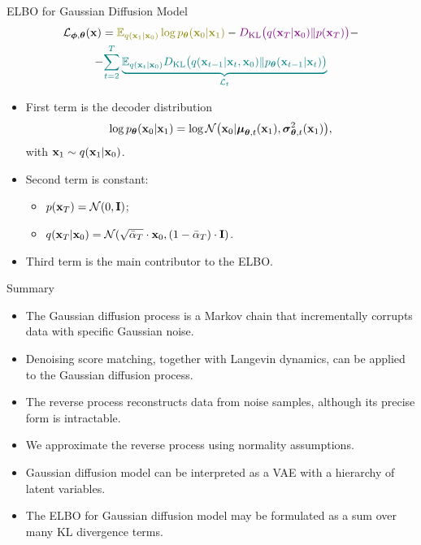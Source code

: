 \documentclass{beamer}
\begin{document}
\begin{frame}{ELBO for Gaussian Diffusion Model}
        \vspace{-0.5cm}
        \begin{multline*}
            \cL_{\bphi, \btheta}(\bx) =  {\color{olive}\bbE_{q(\bx_1 | \bx_0)} \log \pt(\bx_0 | \bx_1)} - {\color{violet}\KL\bigl(q(\bx_T | \bx_0) \| p(\bx_T)\bigr)} - \\
            - {\color{teal}\sum_{t=2}^T \underbrace{ \bbE_{q(\bx_t | \bx_0)} \KL \bigl(q(\bx_{t-1} | \bx_t, \bx_0) \| \pt(\bx_{t-1} | \bx_t)\bigr)}_{\cL_t}}
        \end{multline*}
        \vspace{-0.5cm}
    \eqpause
    \begin{itemize}
        \item {\color{olive}First term} is the decoder distribution
        \[
            \log p_{\boldsymbol{\theta}}(\mathbf{x}_0 | \mathbf{x}_1) = \log \mathcal{N} \bigl(\mathbf{x}_0 | \boldsymbol{\mu}_{\boldsymbol{\theta}, t}(\mathbf{x}_1), \boldsymbol{\sigma}_{\boldsymbol{\theta}, t}^2(\mathbf{x}_1)\bigr),
        \] 
        with $\mathbf{x}_1 \sim q(\mathbf{x}_1 | \mathbf{x}_0)$.
        \eqpause
        \item {\color{violet}Second term} is constant: 
        \begin{itemize}
            \item $p(\mathbf{x}_T) = \mathcal{N}(0, \mathbf{I})$;
            \item $q(\mathbf{x}_T | \mathbf{x}_0) = \mathcal{N}(\sqrt{\bar{\alpha}_T} \cdot \mathbf{x}_0, (1 - \bar{\alpha}_T) \cdot \mathbf{I})$.
        \end{itemize}
        \eqpause
        \item {\color{teal}Third term} is the main contributor to the ELBO.
    \end{itemize}
\end{frame}
\begin{frame}{Summary}
	\begin{itemize}
		\item The Gaussian diffusion process is a Markov chain that incrementally corrupts data with specific Gaussian noise.
		\vfill
		\item Denoising score matching, together with Langevin dynamics, can be applied to the Gaussian diffusion process.
		\vfill
		\item The reverse process reconstructs data from noise samples, although its precise form is intractable.
        \vfill 
        \item We approximate the reverse process using normality assumptions.     
        \vfill
        \item Gaussian diffusion model can be interpreted as a VAE with a hierarchy of latent variables.
        \vfill
        \item The ELBO for Gaussian diffusion model may be formulated as a sum over many KL divergence terms.
	\end{itemize}
\end{frame}
\end{document}
